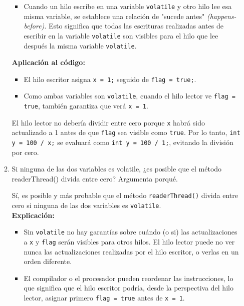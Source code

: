 \begin{enumerate}
\begin{enumerate}
\begin{itemize}
            \item Cuando un hilo escribe en una variable \texttt{volatile} y otro hilo lee esa misma variable, se establece una relación de "sucede antes" \textit{(happens-before)}. Esto significa que todas las escrituras realizadas antes de escribir en la variable \texttt{volatile} son visibles para el hilo que lee después la misma variable \texttt{volatile}.
        \end{itemize}
        
        \textbf{Aplicación al código:}
        
        \begin{itemize}
        \item El hilo escritor asigna \texttt{x = 1;} seguido de \texttt{flag = true;}.
        \item Como ambas variables son \texttt{volatile}, cuando el hilo lector ve \texttt{flag = true}, también garantiza que verá \texttt{x = 1}.
        \end{itemize}
        
        El hilo lector no debería dividir entre cero porque \texttt{x} habrá sido actualizado a 1 antes de que \texttt{flag} sea visible como \texttt{true}. Por lo tanto, \texttt{int y = 100 / x;} se evaluará como \texttt{int y = 100 / 1;}, evitando la división por cero.\\

        \item Si ninguna de las dos variables es volatile, ¿es posible que el método readerThread() divida entre cero? Argumenta porqué.

        Sí, es posible y más probable que el método \texttt{readerThread()} divida entre cero si ninguna de las dos variables es \texttt{volatile}.\\

        \textbf{Explicación:}
        \begin{itemize}
            \item Sin \texttt{volatile} no hay garantías sobre cuándo (o si) las actualizaciones a \texttt{x} y \texttt{flag} serán visibles para otros hilos. El hilo lector puede no ver nunca las actualizaciones realizadas por el hilo escritor, o verlas en un orden diferente.
        
            \item El compilador o el procesador pueden reordenar las instrucciones, lo que significa que el hilo escritor podría, desde la perspectiva del hilo lector, asignar primero \texttt{flag = true} antes de \texttt{x = 1}.
        \end{itemize}
        

\end{enumerate}
\end{enumerate}
